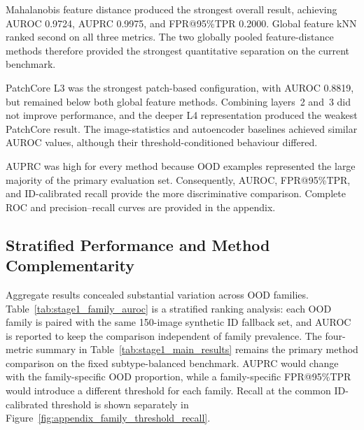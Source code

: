 \documentclass[fleqn,12pt]{olplainarticle}
\begin{document}
Mahalanobis feature distance produced the strongest overall result, achieving
AUROC 0.9724, AUPRC 0.9975, and FPR@95\%TPR 0.2000. Global feature kNN ranked
second on all three metrics. The two globally pooled feature-distance methods
therefore provided the strongest quantitative separation on the current
benchmark.

PatchCore L3 was the strongest patch-based configuration, with AUROC 0.8819,
but remained below both global feature methods. Combining layers~2 and~3 did
not improve performance, and the deeper L4 representation produced the
weakest PatchCore result. The image-statistics and autoencoder baselines
achieved similar AUROC values, although their threshold-conditioned behaviour
differed.

AUPRC was high for every method because OOD examples represented the large
majority of the primary evaluation set. Consequently, AUROC,
FPR@95\%TPR, and ID-calibrated recall provide the more discriminative
comparison. Complete ROC and precision--recall curves are provided in the
appendix.

\subsection{Stratified Performance and Method Complementarity}
\label{subsec:stage1_stratified_results}
\label{subsec:stage1_family_results}
\label{subsec:stage1_subtype_results}
\label{subsec:patchcore_results}

Aggregate results concealed substantial variation across OOD families.
Table~\ref{tab:stage1_family_auroc} is a stratified ranking analysis: each OOD
family is paired with the same 150-image synthetic ID fallback set, and AUROC
is reported to keep the comparison independent of family prevalence. The
four-metric summary in Table~\ref{tab:stage1_main_results} remains the primary
method comparison on the fixed subtype-balanced benchmark. AUPRC would change
with the family-specific OOD proportion, while a family-specific
FPR@95\%TPR would introduce a different threshold for each family. Recall at
the common ID-calibrated threshold is shown separately in
Figure~\ref{fig:appendix_family_threshold_recall}.
\end{document}
